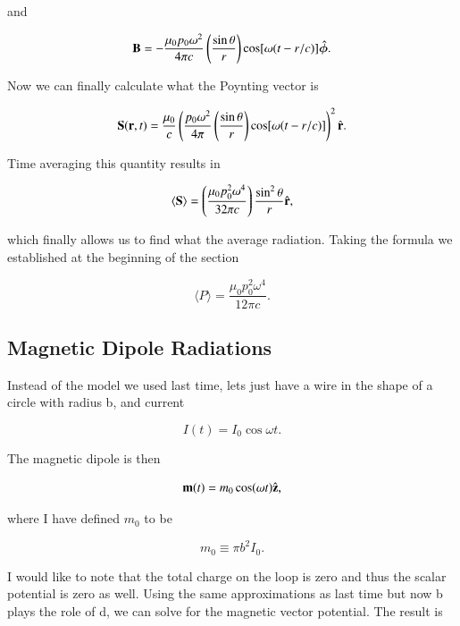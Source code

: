 \documentclass[preprint, review,12pt]{elsarticle}
\def\b{\textbf}
\def\={\equiv}
\def\9{\left(}
\def\0{\right)}
\newcommand{\hb}[1]{\hat{\b #1}}
\newcommand{\hbm}[1]{\hat{\bm #1}}
\newcommand{\brak}[1]{\langle #1 \rangle}
\begin{document}
and

\begin{equation}
    \b B = - \frac{\mu_0 p_0 \omega^2}{4 \pi c} \9 \frac{\sin\theta}{r} \0 \cos[\omega(t-r/c)] \hbm{\phi}.
\end{equation}

Now we can finally calculate what the Poynting vector is

\begin{equation}
    \b S(\b r, t) = \frac{\mu_0}{c} \9 \frac{p_0 \omega^2}{4 \pi} \9 \frac{\sin\theta}{r} \0 \cos[\omega(t-r/c)] \0^2 \hb{r}.
\end{equation}

Time averaging this quantity results in

\begin{equation}
    \brak{\b S} = \9 \frac{\mu_0 p_0^2 \omega^4}{32\pi c} \0 \frac{\sin^2 \theta}{r}\hb{r},
\end{equation}

which finally allows us to find what the average radiation. Taking the formula we established at the beginning of the section

\begin{equation}
    \brak{P} = \frac{\mu_0 p_0^2 \omega^4}{12 \pi c}.
\end{equation}

\subsection{Magnetic Dipole Radiations}

Instead of the model we used last time, lets just have a wire in the shape of a circle with radius b, and current 

\begin{equation}
    I(t) = I_0 \cos\omega t.
\end{equation}

The magnetic dipole is then 

\begin{equation}
    \b m(t) = m_0 \cos(\omega t) \hb{z},
\end{equation}

where I have defined $m_0$ to be

\begin{equation}
    m_0 \= \pi b^2 I_0.
\end{equation}

I would like to note that the total charge on the loop is zero and thus the scalar potential is zero as well. Using the same approximations as last time but now b plays the role of d, we can solve for the magnetic vector potential. The result is
\end{document}
